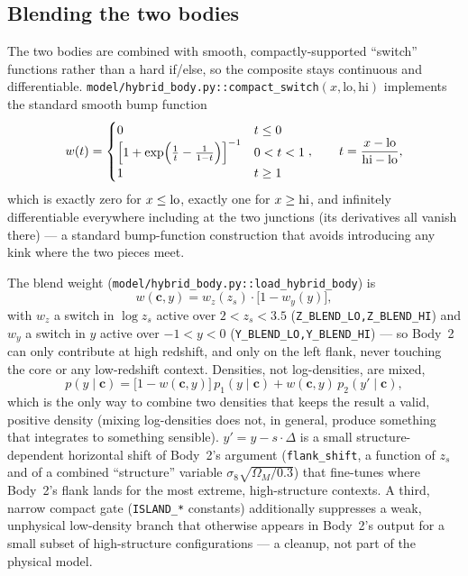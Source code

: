 \documentclass[11pt]{article}
\newcommand{\code}[1]{\texttt{#1}}
\newcommand{\file}[1]{\texttt{#1}}
\newcommand{\vect}[1]{\boldsymbol{#1}}
\begin{document}
\subsection{Blending the two bodies}

The two bodies are combined with smooth, compactly-supported ``switch''
functions rather than a hard if/else, so the composite stays continuous and
differentiable. \file{model/hybrid\_body.py::compact\_switch}$(x,\text{lo},\text{hi})$
implements the standard smooth bump function
\begin{equation}
 w(t) = \begin{cases}
   0 & t\le 0\\
   \left[1+\exp\!\left(\tfrac1t-\tfrac1{1-t}\right)\right]^{-1} & 0<t<1\\
   1 & t\ge1
 \end{cases},\qquad
 t=\frac{x-{\rm lo}}{{\rm hi}-{\rm lo}},
 \label{eq:compactswitch}
\end{equation}
which is exactly zero for $x\le{\rm lo}$, exactly one for $x\ge{\rm hi}$, and
infinitely differentiable everywhere including at the two junctions (its
derivatives all vanish there) — a standard bump-function construction that
avoids introducing any kink where the two pieces meet.

The blend weight (\file{model/hybrid\_body.py::load\_hybrid\_body}) is
\begin{equation}
 w(\vect c, y) = w_z(z_s)\cdot\big[1-w_y(y)\big],
\end{equation}
with $w_z$ a switch in $\log z_s$ active over $2<z_s<3.5$
(\code{Z\_BLEND\_LO,Z\_BLEND\_HI}) and $w_y$ a switch in $y$ active over
$-1<y<0$ (\code{Y\_BLEND\_LO,Y\_BLEND\_HI}) — so Body~2 can only contribute
at high redshift, and only on the left flank, never touching the core or
any low-redshift context. Densities, not log-densities, are mixed,
\begin{equation}
 p(y\mid\vect c) = \big[1-w(\vect c,y)\big]\, p_1(y\mid\vect c) +
 w(\vect c,y)\, p_2(y'\mid\vect c),
 \label{eq:bodymix}
\end{equation}
which is the only way to combine two densities that keeps the result a
valid, positive density (mixing log-densities does not, in general, produce
something that integrates to something sensible). $y' = y - s\cdot\Delta$
is a small structure-dependent horizontal shift of Body~2's argument
(\code{flank\_shift}, a function of $z_s$ and of a combined
``structure'' variable $\sigma_8\sqrt{\Omega_M/0.3}$) that fine-tunes where
Body~2's flank lands for the most extreme, high-structure contexts. A third,
narrow compact gate (\code{ISLAND\_*} constants) additionally suppresses a
weak, unphysical low-density branch that otherwise appears in Body~2's
output for a small subset of high-structure configurations — a cleanup, not
part of the physical model.
\end{document}
